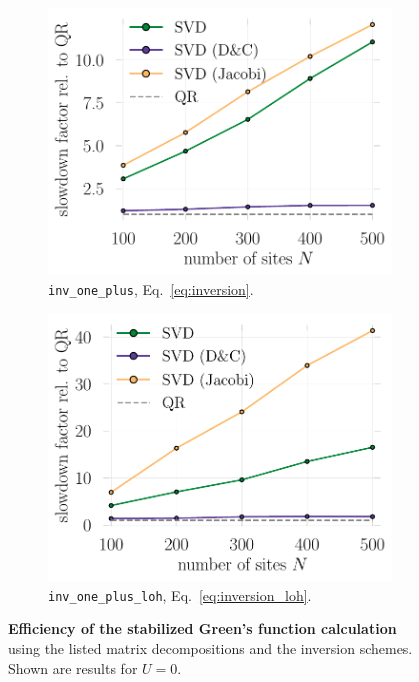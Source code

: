 \documentclass[submission, Phys]{SciPost}
\begin{document}
\begin{figure}
	\centering
	\begin{subfigure}{0.48\textwidth}
			\includegraphics[width=\textwidth]{figures/benchmark_fact_inv_one_plus.pdf}
		\caption{\texttt{inv\_one\_plus}, Eq.~\eqref{eq:inversion}. \label{fig:greens_benchmark_regularinv}}
	\end{subfigure}%
	\hspace{10pt}
	\begin{subfigure}{0.48\textwidth}
		\includegraphics[width=\textwidth]{figures/benchmark_fact_inv_one_plus_loh.pdf}
		\caption{\texttt{inv\_one\_plus\_loh}, Eq.~\eqref{eq:inversion_loh}. \label{fig:greens_benchmark_loh}}
	\end{subfigure}
	\vspace{5pt}
	\caption{\textbf{Efficiency of the stabilized Green's function calculation} using the listed matrix decompositions and the inversion schemes. Shown are results for $U=0$.\label{fig:greens_benchmark}}
\end{figure}
\end{document}
